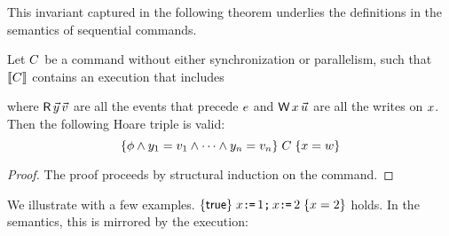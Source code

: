 This invariant captured in the following theorem underlies the definitions in the semantics of sequential commands.
%
\begin{theorem}
Let $C$ be a command without either synchronization or parallelism, such that
$\llbracket C\rrbracket$ contains an execution that includes
\begin{tikzdisplay}[node distance=1em]
\end{tikzdisplay}
where $\DR{\vec{\bLoc}}{\vec{\aVal}}$ are all the events that precede $e$ and
$\DW{\aLoc}{\vec{\dVal}}$ are all the writes on $x$.
Then the following Hoare triple is valid:
\begin{displaymath}
  \{\phi\land y_1=v_1\land\cdots\land y_n=v_n\}\;C\;\{x=w\}  
\end{displaymath}
\begin{proof}
The proof proceeds by structural induction on the command. 
\end{proof}
\end{theorem}


We illustrate with a few examples.
$\{\mathsf{true}\}\;x\texttt{:}\mkern-1mu\texttt{=}\, 1 \texttt{;}\, x \texttt{:}\mkern-1mu\texttt{=}\, 2\;\{x=2\} $ holds.   In the semantics, this is mirrored by the execution:
\begin{tikzdisplay}[node distance=1em]
\end{tikzdisplay}

